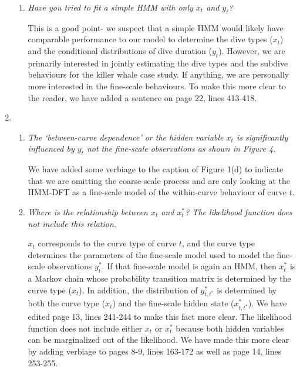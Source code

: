\documentclass{article}
\begin{document}
\begin{enumerate}
\begin{enumerate}
        \item \textit{Have you tried to fit a simple HMM with only $x_t$ and $y_t$?} 
        
        This is a good point- we suspect that a simple HMM would likely have comparable performance to our model to determine the dive types ($x_t$) and the conditional distributions of dive duration ($y_t$). However, we are primarily interested in jointly estimating the dive types and the subdive behaviours for the killer whale case study. If anything, we are personally more interested in the fine-scale behaviours. To make this more clear to the reader, we have added a sentence on page 22, lines 413-418.
        
    \end{enumerate}
    
    \item \begin{enumerate}
        \item \textit{The `between-curve dependence' or the hidden variable $x_t$ is significantly influenced by $y_t$ not the fine-scale observations as shown in Figure 4.}
        
        We have added some verbiage to the caption of Figure 1(d) to indicate that we are omitting the coarse-scale process and are only looking at the HMM-DFT as a fine-scale model of the within-curve behaviour of curve $t$. 
        
        \item \textit{Where is the relationship between $x_t$ and $x^*_t$? The likelihood function does not include this relation.}
        
        $x_t$ corresponds to the curve type of curve $t$, and the curve type determines the parameters of the fine-scale model used to model the fine-scale observations $y^*_t$. If that fine-scale model is again an HMM, then $x^*_t$ is a Markov chain whose probability transition matrix is determined by the curve type ($x_t$). In addition, the distribution of $y^*_{t,t^*}$ is determined by both the curve type ($x_t$) and the fine-scale hidden state ($x^*_{t,t^*}$). We have edited page 13, lines 241-244 to make this fact more clear. The likelihood function does not include either $x_t$ or $x^*_t$ because both hidden variables can be marginalized out of the likelihood. We have made this more clear by adding verbiage to pages 8-9, lines 163-172 as well as page 14, lines 253-255. 
        
    \end{enumerate}
    

\end{enumerate}
\end{document}
